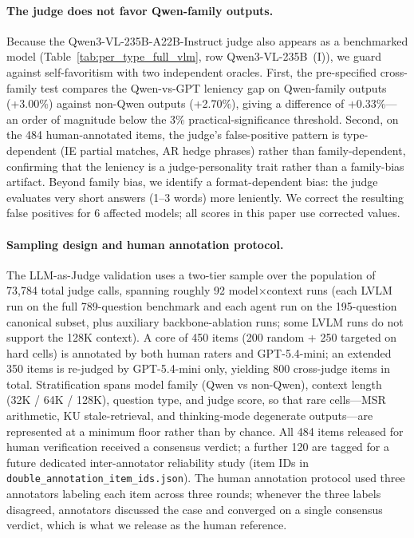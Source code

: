 \documentclass{llmxive}
\begin{document}
\paragraph{The judge does not favor Qwen-family outputs.}
Because the Qwen3-VL-235B-A22B-Instruct judge also appears as a benchmarked model (Table~\ref{tab:per_type_full_vlm}, row Qwen3-VL-235B~(I)), we guard against self-favoritism with two independent oracles.
First, the pre-specified cross-family test compares the Qwen-vs-GPT leniency gap on Qwen-family outputs (+3.00\%) against non-Qwen outputs (+2.70\%), giving a difference of +0.33\%---an order of magnitude below the 3\% practical-significance threshold.
Second, on the 484 human-annotated items, the judge's false-positive pattern is type-dependent (IE partial matches, AR hedge phrases) rather than family-dependent, confirming that the leniency is a judge-personality trait rather than a family-bias artifact.
Beyond family bias, we identify a format-dependent bias: the judge evaluates very short answers (1--3 words) more leniently.
We correct the resulting false positives for 6 affected models; all scores in this paper use corrected values.

\paragraph{Sampling design and human annotation protocol.}
The LLM-as-Judge validation uses a two-tier sample over the population of 73{,}784 total judge calls, spanning roughly 92 model$\times$context runs (each LVLM run on the full 789-question benchmark and each agent run on the 195-question canonical subset, plus auxiliary backbone-ablation runs; some LVLM runs do not support the 128K context).
A core of 450 items (200 random + 250 targeted on hard cells) is annotated by both human raters and GPT-5.4-mini; an extended 350 items is re-judged by GPT-5.4-mini only, yielding 800 cross-judge items in total.
Stratification spans model family (Qwen vs non-Qwen), context length (32K / 64K / 128K), question type, and judge score, so that rare cells---MSR arithmetic, KU stale-retrieval, and thinking-mode degenerate outputs---are represented at a minimum floor rather than by chance.
All 484 items released for human verification received a consensus verdict; a further 120 are tagged for a future dedicated inter-annotator reliability study (item IDs in \texttt{double\_annotation\_item\_ids.json}).
The human annotation protocol used three annotators labeling each item across three rounds; whenever the three labels disagreed, annotators discussed the case and converged on a single consensus verdict, which is what we release as the human reference.
\end{document}
